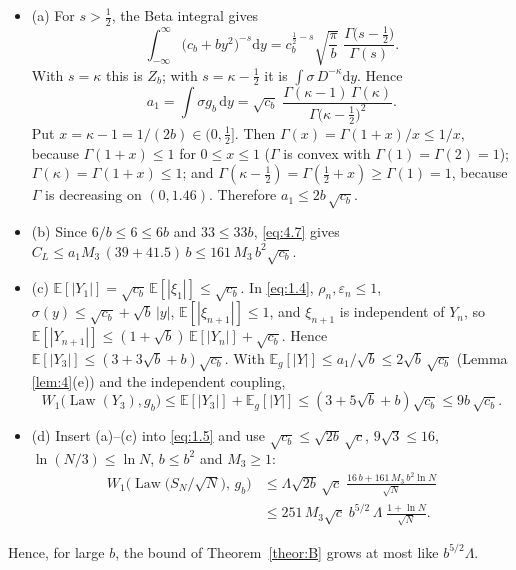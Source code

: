 \documentclass[aip,jmp,preprint,onecolumn,floatfix,superscriptaddress,nofootinbib,11pt]{revtex4-2}
\theoremstyle{plain}
\theoremstyle{remark}
\numberwithin{equation}{section}
\newcommand{\dd}{\mathrm{d}}
\newcommand{\E}{\mathbb{E}}
\newcommand{\eps}{\varepsilon}
\newcommand{\Law}{\operatorname{Law}}
\begin{document}
\begin{itemize}
\item (a) For $s>\tfrac12$, the Beta integral gives
\begin{equation}
\int_{-\infty}^{\infty}\big(c_b+by^{2}\big)^{-s}\dd y=c_b^{\frac12-s}\sqrt{\frac\pi b}\;\frac{\Gamma\big(s-\frac12\big)}{\Gamma(s)} .
\label{eq:5.2}
\end{equation}
%
      With $s=\kappa$ this is $Z_b$; with $s=\kappa-\tfrac12$ it is $\int\sigma\,D^{-\kappa}\dd y$. Hence
\begin{equation*}
a_1=\int\sigma g_b\,\dd y=\sqrt{c_b}\;\frac{\Gamma(\kappa-1)\,\Gamma(\kappa)}{\Gamma\big(\kappa-\frac12\big)^{2}} .
\end{equation*}
%
      Put $x=\kappa-1=1/(2b)\in(0,\tfrac12]$. Then $\Gamma(x)=\Gamma(1+x)/x\le1/x$, because $\Gamma(1+x)\le1$ for $0\le x\le1$ ($\Gamma$ is convex with $\Gamma(1)=\Gamma(2)=1$); $\Gamma(\kappa)=\Gamma(1+x)\le1$; and $\Gamma(\kappa-\tfrac12)=\Gamma(\tfrac12+x)\ge\Gamma(1)=1$, because $\Gamma$ is decreasing on $(0,1.46)$. Therefore $a_1\le2b\,\sqrt{c_b}$.
\item (b) Since $6/b\le6\le6b$ and $33\le33b$, \eqref{eq:4.7} gives $C_L\le a_1M_3\,(39+41.5)\,b\le161\,M_3\,b^{2}\sqrt{c_b}$.
\item (c) $\E[|Y_1|]=\sqrt{c_b}\,\E[|\xi_1|]\le\sqrt{c_b}$. In \eqref{eq:1.4}, $\rho_n,\eps_n\le1$, $\sigma(y)\le\sqrt{c_b}+\sqrt b\,|y|$, $\E[|\xi_{n+1}|]\le1$, and $\xi_{n+1}$ is independent of $Y_n$, so $\E[|Y_{n+1}|]\le(1+\sqrt b)\,\E[|Y_n|]+\sqrt{c_b}$. Hence $\E[|Y_3|]\le(3+3\sqrt b+b)\sqrt{c_b}$. With $\E_{g}[|Y|]\le a_1/\sqrt b\le2\sqrt b\,\sqrt{c_b}$ (Lemma \ref{lem:4}(e)) and the independent coupling,
\begin{equation*}
W_1\big(\Law(Y_3),g_b\big)\le\E[|Y_3|]+\E_{g}[|Y|]\le(3+5\sqrt b+b)\sqrt{c_b}\le9b\,\sqrt{c_b}.
\end{equation*}
 
\item (d) Insert (a)--(c) into \eqref{eq:1.5} and use $\sqrt{c_b}\le\sqrt{2b}\,\sqrt c$, $9\sqrt3\le16$, $\ln(N/3)\le\ln N$, $b\le b^{2}$ and $M_3\ge1$:
\begin{equation}
\begin{aligned} W_1\Big(\Law\big(S_N/\sqrt N\big),\,g_b\Big)&\le\Lambda\sqrt{2b}\,\sqrt c\;\frac{16\,b+161\,M_3\,b^{2}\ln N}{\sqrt N}\\[4pt] &\le251\,M_3\sqrt c\;b^{5/2}\,\Lambda\;\frac{1+\ln N}{\sqrt N}. \end{aligned}
\label{eq:5.3}
\end{equation}
 
\end{itemize}
%
Hence, for large $b$, the bound of Theorem~\ref{theor:B} grows at most like $b^{5/2}\Lambda$.
 
\end{document}
